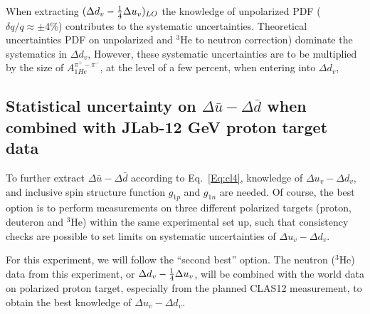 
When extracting $( \Delta d_v -{1 \over 4} \Delta u_v )_{LO}$ 
the knowledge of unpolarized PDF ($\delta q/q \approx \pm 4\%$)  contributes 
to the systematic uncertainties. Theoretical uncertainties  PDF on unpolarized  and $^3$He to neutron correction) dominate the systematics in $\Delta d_v$,  However, these systematic uncertainties are  to be multiplied by the size of  $A_{1He}^{\pi^+ - \pi^-}$, at the level of a few percent, when entering into $\Delta d_v$, %

% 


\subsection{Statistical uncertainty on $\Delta \bar{u} -\Delta \bar{d}$ when combined with JLab-12 GeV proton target data}
To further extract $\Delta \bar{u}-\Delta \bar{d}$ according to Eq.~\ref{Eq:cl4}, 
knowledge of $\Delta u_v - \Delta d_v$, and inclusive spin structure function  $g_{1p}$ and $g_{1n}$ are needed.  
Of course, the best option is to perform measurements on three different polarized 
targets (proton, deuteron and $^3$He) within the same experimental set up, such that
consistency checks are possible to set limits on systematic uncertainties of $\Delta u_v - \Delta d_v$.

For this experiment, we will follow the ``second best'' option.  The neutron ($^3$He) data from this experiment, or $\Delta d_v - {1 \over 4} \Delta u_v$,
will be combined with the world data on polarized proton target, especially from the planned CLAS12 measurement,
to obtain the best knowledge of $\Delta u_v - \Delta d_v$.


